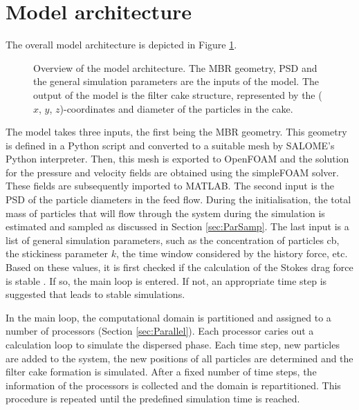 \section{Model architecture}
The overall model architecture is depicted in Figure \ref{fig:ModelStruct}.
\begin{figure}[]
    \centering
    \def\svgwidth{\columnwidth}
    
    \caption{Overview of the model architecture. The \gls{MBR} geometry, \gls{PSD} and the general simulation parameters are the inputs of the model. The output of the model is the filter cake structure, represented by the ($x$, $y$, $z$)-coordinates and diameter of the particles in the cake. }
    \label{fig:ModelStruct}
\end{figure}
The model takes three inputs, the first being the \gls{MBR} geometry. This geometry is defined in a Python script and converted to a suitable mesh by SALOME's Python interpreter. Then, this mesh is exported to OpenFOAM and the solution for the pressure and velocity fields are obtained using the simpleFOAM solver. These fields are subsequently imported to MATLAB. %
The second input is the \gls{PSD} of the particle diameters in the feed flow. During the initialisation, the total mass of particles that will flow through the system during the simulation is estimated and sampled as discussed in Section \ref{sec:ParSamp}. The last input is a list of general simulation parameters, such as the concentration of particles \gls{cb}, the stickiness parameter $k$, the time window considered by the history force, etc. Based on these values, %
it is first checked if the calculation of the Stokes drag force is stable \citep{Ghijs2014}. If so, the main loop is entered. If not, an appropriate time step is suggested that leads to stable simulations.\par
In the main loop, the computational domain is partitioned and assigned to a number of processors (Section \ref{sec:Parallel}). Each processor caries out a calculation loop to simulate the dispersed phase. Each time step, new particles are added to the system, the new positions of all particles are determined and the filter cake formation is simulated. After a fixed number of time steps, the information of the processors is collected and the domain is repartitioned. This procedure is repeated until the predefined simulation time is reached. %

